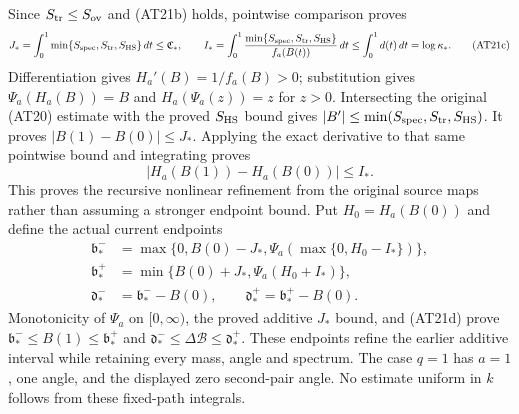 Since $S_{\rm tr}\le S_{\rm ov}$ and (AT21b) holds, pointwise
comparison proves
\[
J_* =\int_0^1\min\{S_{\rm spec},S_{\rm tr},S_{\rm HS}\}\,dt
 \le\mathfrak C_*,\qquad
I_* =\int_0^1\frac{\min\{S_{\rm spec},S_{\rm tr},S_{\rm HS}\}}{f_a(B(t))}\,dt
 \le\int_0^1d(t)\,dt=\log\kappa_* .\tag{AT21c}
\]
Differentiation gives $H_a'(B)=1/f_a(B)>0$; substitution gives
$\Psi_a(H_a(B))=B$ and $H_a(\Psi_a(z))=z$ for $z>0$.
Intersecting the original (AT20) estimate with the proved
$S_{\rm HS}$ bound gives $|B'|\le\min(S_{\rm spec},S_{\rm tr},S_{\rm HS})$.
It proves $|B(1)-B(0)|\le J_*$. Applying the exact derivative
to that same pointwise bound and integrating proves
\[
|H_a(B(1))-H_a(B(0))|\le I_* .\tag{AT21d}
\]
This proves the recursive nonlinear refinement from the original
source maps rather than assuming a stronger endpoint bound.
Put $H_0=H_a(B(0))$ and define the actual current endpoints
\[
\begin{aligned}
\mathfrak b_*^-&=\max\{0,B(0)-J_*,
                      \Psi_a(\max\{0,H_0-I_*\})\},\\
\mathfrak b_*^+&=\min\{B(0)+J_*,\Psi_a(H_0+I_*)\},\\
\mathfrak d_*^-&=\mathfrak b_*^--B(0),\qquad
\mathfrak d_*^+=\mathfrak b_*^+-B(0).
\end{aligned}\tag{AT21e}
\]
Monotonicity of $\Psi_a$ on $[0,\infty)$, the proved additive
$J_*$ bound, and (AT21d)
prove $\mathfrak b_*^-\le B(1)\le\mathfrak b_*^+$ and
$\mathfrak d_*^-\le\Delta\mathcal B\le\mathfrak d_*^+$.
These endpoints refine the earlier additive interval while retaining
every mass, angle and spectrum. The case $q=1$ has $a=1$, one
angle, and the displayed zero second-pair angle. No estimate
uniform in $k$ follows from these fixed-path integrals.

